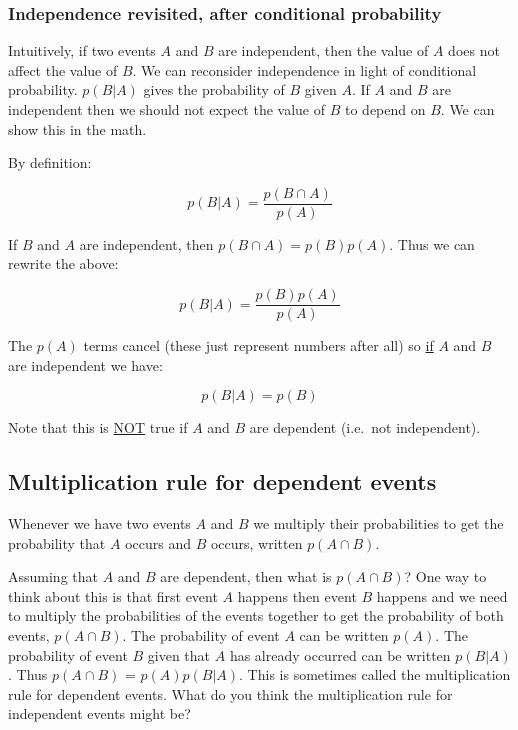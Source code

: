 \documentclass[]{article}
\theoremstyle{definition}
\begin{document}
\subsubsection{Independence revisited, after conditional probability} 

Intuitively, if two events $A$ and $B$ are independent, then the value of $A$ does not affect the value of $B$. We can reconsider independence in light of conditional probability. $p(B|A)$ gives the probability of $B$ given $A$. If $A$ and $B$ are independent then we should not expect the value of $B$ to depend on $B$. We can show this in the math. 

By definition:

\begin{equation}
p(B|A) = \frac{p(B \cap A)}{p(A)}
\end{equation}

If $B$ and $A$ are independent, then $p(B \cap A) = p(B)p(A)$. Thus we can rewrite the above:

\begin{equation}
p(B|A) = \frac{p(B)p(A)}{p(A)}
\end{equation}

The $p(A)$ terms cancel (these just represent numbers after all) so \underline{if} $A$ and $B$ are independent we have:

\begin{equation}
p(B|A) = p(B)
\end{equation}

Note that this is \underline{NOT} true if $A$ and $B$ are dependent (i.e.\ not independent).

\subsection{Multiplication rule for dependent events}

Whenever we have two events $A$ and $B$ we multiply their probabilities to get the probability that $A$ occurs and $B$ occurs, written $p(A \cap B)$. 

Assuming that $A$ and $B$ are dependent, then what is $p(A \cap B)$? One way to think about this is that first event $A$ happens then event $B$ happens and we need to multiply the probabilities of the events together to get the probability of both events, $p(A \cap B)$. The probability of event $A$ can be written $p(A)$. The probability of event $B$ given that $A$ has already occurred can be written $p(B \vert A)$. Thus $p(A \cap B)$ = $p(A)p(B \vert A)$. This is sometimes called the multiplication rule for dependent events. What do you think the multiplication rule for independent events might be?
\end{document}
